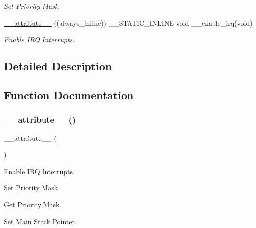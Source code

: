 \begin{DoxyCompactItemize}
\begin{DoxyCompactList}\small\item\em Set Priority Mask. \end{DoxyCompactList}\item 
\mbox{\hyperlink{group___c_m_s_i_s___core___reg_acc_functions_ga671b4fa3b3ab3dbc685a5473f3fc76aa}{\+\_\+\+\_\+attribute\+\_\+\+\_\+}} ((always\+\_\+inline)) \+\_\+\+\_\+\+S\+T\+A\+T\+I\+C\+\_\+\+I\+N\+L\+I\+NE void \+\_\+\+\_\+enable\+\_\+irq(void)
\begin{DoxyCompactList}\small\item\em Enable I\+RQ Interrupts. \end{DoxyCompactList}\end{DoxyCompactItemize}


\subsection{Detailed Description}


\subsection{Function Documentation}
\mbox{\label{group___c_m_s_i_s___core___reg_acc_functions_ga671b4fa3b3ab3dbc685a5473f3fc76aa}} 
\subsubsection{\texorpdfstring{\+\_\+\+\_\+attribute\+\_\+\+\_\+()}{\_\_attribute\_\_()}}
{\footnotesize\ttfamily \+\_\+\+\_\+attribute\+\_\+\+\_\+ (\begin{DoxyParamCaption}\item[{(always\+\_\+inline)}]{ }\end{DoxyParamCaption})}



Enable I\+RQ Interrupts. 

Set Priority Mask.

Get Priority Mask.

Set Main Stack Pointer.

